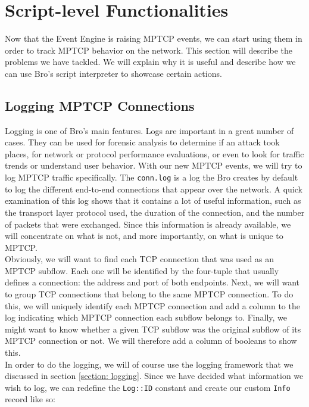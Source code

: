 
\chapter{Script-level Functionalities} \label{chap:script}
Now that the Event Engine is raising MPTCP events, we can start using them in order to track MPTCP behavior on the network. This section will describe the problems we have tackled. We will explain why it is useful and describe how we can use Bro's script interpreter to showcase certain actions.

\section{Logging MPTCP Connections} \label{section:mp log}
Logging is one of Bro's main features. Logs are important in a great number of cases. They can be used for forensic analysis to determine if an attack took places, for network or protocol performance evaluations, or even to look for traffic trends or understand user behavior. With our new MPTCP events, we will try to log MPTCP traffic specifically. The \texttt{conn.log} is a log the Bro creates by default to log the different end-to-end connections that appear over the network. A quick examination of this log shows that it contains a lot of useful information, such as the transport layer protocol used, the duration of the connection, and the number of packets that were exchanged. Since this information is already available, we will concentrate on what is not, and more importantly, on what is unique to MPTCP. \\

Obviously, we will want to find each TCP connection that was used as an MPTCP subflow. Each one will be identified by the four-tuple that usually defines a connection: the address and port of both endpoints. Next, we will want to group TCP connections that belong to the same MPTCP connection. To do this, we will uniquely identify each MPTCP connection and add a column to the log indicating which MPTCP connection each subflow belongs to. Finally, we might want to know whether a given TCP subflow was the original subflow of its MPTCP connection or not. We will therefore add a column of booleans to show this. \\

In order to do the logging, we will of course use the logging framework that we discussed in section \ref{section: logging}. Since we have decided what information we wish to log, we can redefine the \texttt{Log::ID} constant and create our custom \texttt{Info} record like so: \\

